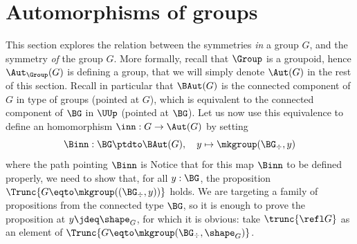 \section{Automorphisms of groups}
\label{sec:aut-group}%

This section explores the relation between the symmetries {\em in} a group $G$,
and the symmetry {\em of} the group $G$. More formally, recall that $\Group$ is
a groupoid, hence $\Aut_\Group(G)$ is defining a group, that we will simply
denote $\Aut(G)$ in the rest of this section. Recall in particular that
$\BAut(G)$ is the connected component of $G$ in type of groups (pointed at $G$),
which is equivalent to the connected component of $\BG$ in $\UUp$ (pointed at
$\BG$). Let us now use this equivalence to define an homomorphism
$\inn: G \to \Aut(G)$ by setting
\begin{displaymath}
  \Binn : \BG \ptdto \BAut(G), \quad y \mapsto \mkgroup(\BG_\div , y)
\end{displaymath}
where the path pointing $\Binn$ is 
Notice that for
this map $\Binn$ to be defined properly, we need to show that, for all $y:\BG$, the proposition
$\Trunc{G \eqto \mkgroup((\BG_\div , y))}$ holds.  
We are targeting a family of propositions
from the connected type $\BG$, so it is enough to prove the proposition at
$y\jdeq \sh_G$, for which it is obvious: take $\trunc{\refl G}$ as an
element of $\Trunc{G \eqto \mkgroup(\BG_\div , \sh_G)}$.

